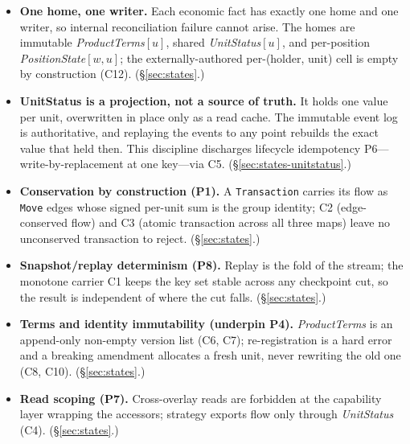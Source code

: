 \begin{itemize}[nosep]
\item \textbf{One home, one writer.} Each economic fact has exactly one home and one
writer, so internal reconciliation failure cannot arise. The homes are immutable
\emph{ProductTerms}$[u]$, shared \emph{UnitStatus}$[u]$, and per-position
\emph{PositionState}$[w,u]$; the externally-authored per-(holder, unit) cell is empty by
construction (C12). (\S\ref{sec:states}.)
\item \textbf{UnitStatus is a projection, not a source of truth.} It holds one value per
unit, overwritten in place only as a read cache. The immutable event log is
authoritative, and replaying the events to any point rebuilds the exact value that held
then. This discipline discharges lifecycle idempotency P6---write-by-replacement at one
key---via C5. (\S\ref{sec:states-unitstatus}.)
\item \textbf{Conservation by construction (P1).} A \texttt{Transaction} carries its flow
as \texttt{Move} edges whose signed per-unit sum is the group identity; C2 (edge-conserved
flow) and C3 (atomic transaction across all three maps) leave no unconserved transaction
to reject. (\S\ref{sec:states}.)
\item \textbf{Snapshot/replay determinism (P8).} Replay is the fold of the stream; the
monotone carrier C1 keeps the key set stable across any checkpoint cut, so the result is
independent of where the cut falls. (\S\ref{sec:states}.)
\item \textbf{Terms and identity immutability (underpin P4).} \emph{ProductTerms} is an
append-only non-empty version list (C6, C7); re-registration is a hard error and a breaking
amendment allocates a fresh unit, never rewriting the old one (C8, C10).
(\S\ref{sec:states}.)
\item \textbf{Read scoping (P7).} Cross-overlay reads are forbidden at the capability layer
wrapping the accessors; strategy exports flow only through \emph{UnitStatus} (C4).
(\S\ref{sec:states}.)
\end{itemize}


